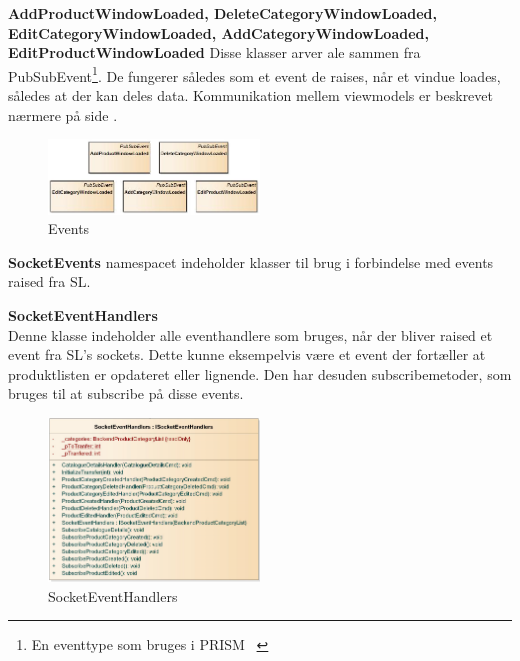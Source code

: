 \label{WindowLoadedEvents_Beskrivelse}
\textbf{AddProductWindowLoaded, DeleteCategoryWindowLoaded, EditCategoryWindowLoaded, AddCategoryWindowLoaded, EditProductWindowLoaded}
Disse klasser arver ale sammen fra PubSubEvent\footnote{En eventtype som bruges i PRISM ~\cite{PRISM}}. De fungerer således som et event de raises, når et vindue loades, således at der kan deles data. Kommunikation mellem viewmodels er beskrevet nærmere på side \pageref{viewcomm}. \bigskip
\begin{center}
\begin{figure}[!h]
    \centering
    \includegraphics[width=0.50\textwidth]{Systemdesign/backend/klassebeskrivelser/Images/Events2.png}
    \caption{Events}
    \label{fig:AddProductWindowLoaded}
\end{figure}
\end{center}
\label{AddProductWindowLoaded_Beskrivelse}
 \bigskip 


\bigskip
\bigskip

\textbf{SocketEvents} namespacet indeholder klasser til brug i forbindelse med events raised fra \gls{SL}.\\
\bigskip

\textbf{SocketEventHandlers}\\
Denne klasse indeholder alle eventhandlere som bruges, når der bliver raised et event fra \gls{SL}'s sockets. Dette kunne eksempelvis være et event der fortæller at produktlisten er opdateret eller lignende. Den har desuden subscribemetoder, som bruges til at subscribe på disse events.
\begin{center}
\begin{figure}[!h]
    \centering
    \includegraphics[width=0.50\textwidth]{Systemdesign/backend/klassebeskrivelser/Images/SocketEvents.png}
    \caption{SocketEventHandlers}
    \label{fig:SocketEventHandlers}
\end{figure}
\end{center}
\label{SocketEventHandlerBeskrivelse}
 \bigskip 
 
